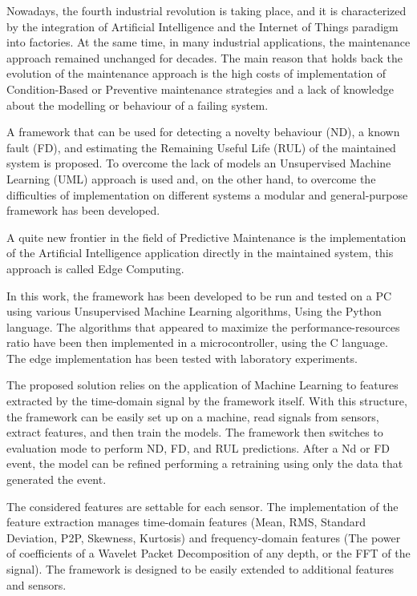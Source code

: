 Nowadays, the fourth industrial revolution is taking place, and it is characterized by the integration of Artificial Intelligence and the Internet of Things paradigm into factories. At the same time, in many industrial applications, the maintenance approach remained unchanged for decades. The main reason that holds back the evolution of the maintenance approach is the high costs of implementation of Condition-Based or Preventive maintenance strategies and a lack of knowledge about the modelling or behaviour of a failing system.

A framework that can be used for detecting a novelty behaviour (ND), a known fault (FD), and estimating the Remaining Useful Life (RUL) of the maintained system is proposed. To overcome the lack of models an Unsupervised Machine Learning (UML) approach is used and, on the other hand, to overcome the difficulties of implementation on different systems a modular and general-purpose framework has been developed.

A quite new frontier in the field of Predictive Maintenance is the implementation of the Artificial Intelligence application directly in the maintained system, this approach is called Edge Computing.

In this work, the framework has been developed to be run and tested on a PC using various Unsupervised Machine Learning algorithms, Using the Python language. The algorithms that appeared to maximize the performance-resources ratio have been then implemented in a microcontroller, using the C language. The edge implementation has been tested with laboratory experiments.

The proposed solution relies on the application of Machine Learning to features extracted by the time-domain signal by the framework itself. With this structure, the framework can be easily set up on a machine, read signals from sensors, extract features, and then train the models. The framework then switches to evaluation mode to perform ND, FD, and RUL predictions. After a Nd or FD event, the model can be refined performing a retraining using only the data that generated the event.

The considered features are settable for each sensor. The implementation of the feature extraction manages time-domain features (Mean, RMS, Standard Deviation, P2P, Skewness, Kurtosis) and frequency-domain features (The power of coefficients of a Wavelet Packet Decomposition of any depth, or the FFT of the signal). The framework is designed to be easily extended to additional features and sensors.

